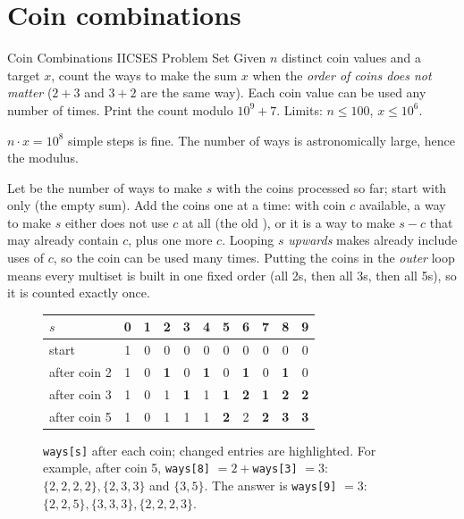 \section[Coin combinations]{Coin combinations \hfill \gold}\label{wp:coins}

\begin{statement}{Coin Combinations II}{CSES Problem Set}
Given $n$ distinct coin values and a target $x$, count the ways to make the sum $x$ when the \emph{order of coins does not
matter} ($2 + 3$ and $3 + 2$ are the same way). Each coin value can be used any number of times. Print the count modulo
$10^9+7$. Limits: $n \le 100$, $x \le 10^6$.
\end{statement}

 $n\cdot x = 10^8$ simple steps is fine. The number of ways is astronomically large, hence the
modulus.

 Let  be the number of ways to make $s$ with the coins processed so far; start with only
 (the empty sum). Add the coins one at a time: with coin $c$ available, a way to make $s$ either does not use
$c$ at all (the old ), or it is a way to make $s - c$ that may already contain $c$, plus one more $c$. Looping
$s$ \emph{upwards} makes  already include uses of $c$, so the coin can be used many times. Putting the coins
in the \emph{outer} loop means every multiset is built in one fixed order (all 2s, then all 3s, then all 5s), so it is
counted exactly once.

\begin{figure}[H]
\centering
\newcommand{\chg}[1]{\cellcolor{cporange!18}\textbf{#1}}
\small
\begin{tabular}{l*{10}{c}}
\toprule
$s$ & 0 & 1 & 2 & 3 & 4 & 5 & 6 & 7 & 8 & 9 \\
\midrule
start & 1 & 0 & 0 & 0 & 0 & 0 & 0 & 0 & 0 & 0 \\
after coin 2 & 1 & 0 & \chg{1} & 0 & \chg{1} & 0 & \chg{1} & 0 & \chg{1} & 0 \\
after coin 3 & 1 & 0 & 1 & \chg{1} & 1 & \chg{1} & \chg{2} & \chg{1} & \chg{2} & \chg{2} \\
after coin 5 & 1 & 0 & 1 & 1 & 1 & \chg{2} & 2 & \chg{2} & \chg{3} & \cellcolor{cpgreen!25}\textbf{3} \\
\bottomrule
\end{tabular}
\caption{\texttt{ways[s]} after each coin; changed entries are highlighted. For example, after coin 5,
\texttt{ways[8]} $= 2 + {}$\texttt{ways[3]} $= 3$: $\{2,2,2,2\}, \{2,3,3\}$ and $\{3,5\}$. The answer is \texttt{ways[9]} $= 3$:
$\{2,2,5\}, \{3,3,3\}, \{2,2,2,3\}$.}
\end{figure}

